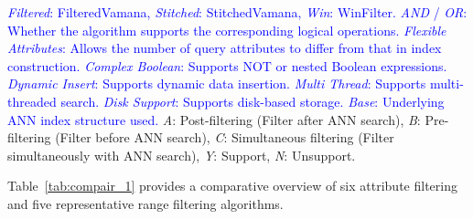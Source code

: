 \documentclass[sigconf, nonacm]{acmart}
\begin{document}
{\begin{table}[t]
		
		\centering
		\footnotesize{
			\begin{minipage}{\linewidth}
				\vspace{0.1cm}
		\textcolor{blue}{
		\textit{Filtered}: FilteredVamana, \textit{Stitched}: StitchedVamana, \textit{Win}: WinFilter.
		\textit{AND} / \textit{OR}: Whether the algorithm supports the corresponding logical operations.
		\textit{Flexible Attributes}: Allows the number of query attributes to differ from that in index construction.
		\textit{Complex Boolean}: Supports NOT or nested Boolean expressions.
		\textit{Dynamic Insert}: Supports dynamic data insertion.
		\textit{Multi Thread}: Supports multi-threaded search.
		\textit{Disk Support}: Supports disk-based storage.
		\textit{Base}: Underlying ANN index structure used.}
		\textit{A}: Post-filtering (Filter after ANN search), 
		\textit{B}: Pre-filtering (Filter before ANN search), 
		\textit{C}: Simultaneous filtering (Filter simultaneously with ANN search), 
		\textit{Y}: Support, 
		\textit{N}: Unsupport. 
		\end{minipage}}
		
	\end{table}
	
	
	Table~\ref{tab:compair_1} provides a comparative overview of six attribute filtering and five representative range filtering algorithms. 
	
}
\end{document}
